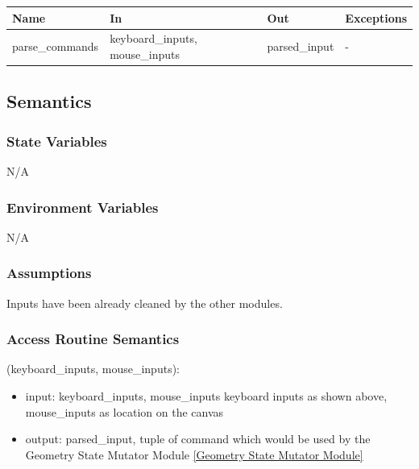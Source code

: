 \documentclass[12pt, titlepage]{article}
\begin{document}
\begin{center}
\begin{tabular}{p{3cm} p{4cm} p{4cm} p{2cm}}
\hline
\textbf{Name} & \textbf{In} & \textbf{Out} & \textbf{Exceptions} \\
\hline
{parse\_commands} & keyboard\_inputs, mouse\_inputs & parsed\_input & - \\
\hline
\end{tabular}
\end{center}

\subsection{Semantics}

\subsubsection{State Variables}
N/A

\subsubsection{Environment Variables}
N/A

\subsubsection{Assumptions}
Inputs have been already cleaned by the other modules.

\subsubsection{Access Routine Semantics}

(keyboard\_inputs, mouse\_inputs):
\begin{itemize}
\item input: keyboard\_inputs, mouse\_inputs keyboard inputs as shown above, mouse\_inputs as location on the canvas
\item output: parsed\_input, tuple of command which would be used by the Geometry State Mutator Module \ref{Geometry State Mutator Module}
\end{itemize}
\end{document}
